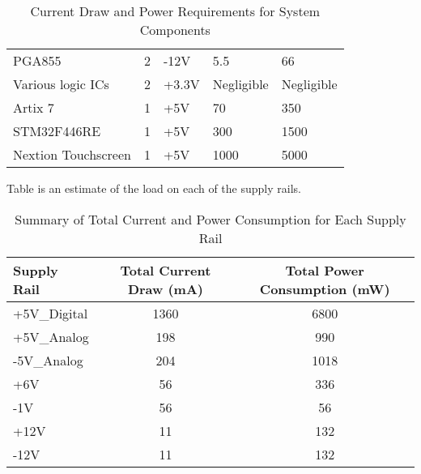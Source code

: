 \begin{table}[ht]
\begin{tabular}{@{}lcp{1.5cm}p{1.8cm}p{2cm}@{}}
            PGA855                   & 2               & -12V                 & 5.5                        & 66                              \\
            Various logic ICs        & 2               & +3.3V                 & Negligible                & Negligible                              \\
            Artix 7                  & 1               & +5V                   & 70                         & 350                               \\
            STM32F446RE                    & 1               & +5V                  & 300                        & 1500                             \\
            Nextion Touchscreen       & 1               & +5V                  & 1000                       & 5000                             \\ \bottomrule
            \end{tabular}
            \caption{Current Draw and Power Requirements for System Components}
            \label{tab:A_current_draw_power}
            \end{table}
Table  is an estimate of the load on each of the supply rails.
            \begin{table}[ht]
                \centering
                \begin{tabular}{@{}lcc@{}}
                \toprule
                \textbf{Supply Rail} & \textbf{Total Current Draw (mA)} & \textbf{Total Power Consumption (mW)} \\ \midrule
                +5V\_Digital          &        1360                                & 6800                                      \\  
                +5V\_Analog                  & 198                            & 990                                  \\
                -5V\_Analog                  & 204                             & 1018                                  \\
                +6V                  & 56                             & 336                                  \\
                -1V                  & 56                             & 56                                   \\
                +12V                 & 11                              & 132                                   \\
                -12V                 & 11                              & 132                                   \\ \bottomrule
                \end{tabular}
                \caption{Summary of Total Current and Power Consumption for Each Supply Rail}
                \label{tab:total_power_current}
                \end{table}
                
